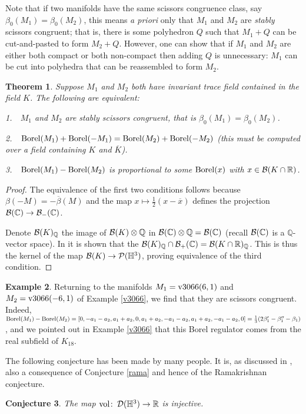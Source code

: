 \documentclass[a4paper]{amsart}
\def\H{{\mathbb H}}
\def\Q{{\mathbb Q}}
\def\R{{\mathbb R}}
\def\C{{\mathbb C}}
\def\K{\tilde{K}}
\newtheorem{theorem}{Theorem}[section]
\newtheorem{conjecture}[theorem]{Conjecture}
\theoremstyle{definition}
\newtheorem{example}[theorem]{Example}
\begin{document}
Note that if two manifolds have the same scissors congruence class,
say $\beta_0(M_1)=\beta_0(M_2)$, this means {\it a priori} only that
$M_1$ and $M_2$ are \emph{stably} scissors congruent; that is, there
is some polyhedron $Q$ such that $M_1+Q$ can be cut-and-pasted to form
$M_2+Q$. However, one can show that if $M_1$ and $M_2$ are either both
compact or both non-compact then adding $Q$ is unnecessary: $M_1$ can
be cut into polyhedra that can be reassembled to form $M_2$. 

\begin{theorem}\label{sc} Suppose $M_1$ and $M_2$ both have invariant
trace field contained in the field $K$. The following are equivalent: 

1.~~$M_1$ and $M_2$ are stably scissors congruent, that is
$\beta_0(M_1)=\beta_0(M_2)$.

2.~~$\operatorname{Borel}(M_1)+\operatorname{Borel}(-M_1)=\operatorname{Borel}(M_2)+\operatorname{Borel}(-M_2)$ (this must be
computed over a field containing $K$ and $\overline K$). 

3.~~$\operatorname{Borel}(M_1)-\operatorname{Borel}(M_2)$ is proportional to some $\operatorname{Borel}(x)$ with
$x\in\Bloch(K\cap\R)$.
\end{theorem}
\begin{proof} The equivalence of the first two conditions follows
because $\beta(-M)=-\overline\beta(M)$ and the map
$x\mapsto\frac12(x-\overline x)$ defines the projection
$\Bloch(\C)\to\Bloch_-(\C)$.

Denote $\Bloch(K)_\Q$ the image of $\Bloch(K)\otimes\Q$ in
$\Bloch(\C)\otimes\Q=\Bloch(\C)$ (recall $\Bloch(\C)$ is a $\Q$-vector
space). In \cite{neumann-yang2} it is shown that the
$\Bloch(K)_\Q\cap\Bloch_+(\C)=\Bloch(K\cap\R)_\Q$. This is thus the
kernel of the map $\Bloch(K)\to\sc(\H^3)$, proving equivalence of the
third condition.
\end{proof}

\begin{example}\def\K{K_{18}} Returning to the manifolds
$M_1=\hbox{v3066}(6,1)$ and $M_2=\hbox{v3066}(-6,1)$ of Example
\ref{v3066}, we find that they are scissors congruent. Indeed,
$\operatorname{Borel}(M_1)-\operatorname{Borel}(M_2)=
[0,-a_1-a_2,a_1+a_2,0,a_1+a_2,-a_1-a_2,a_1+a_2,-a_1-a_2,0]=
\frac13(2\beta_1'-\beta_1''-\beta_1)$, and we pointed out in Example
\ref{v3066} that this Borel regulator comes from the real subfield of
$\K$. \end{example}

The following conjecture has been made by many people. It is, as
discussed in \cite{neumann-hilbert}, also a consequence of Conjecture
\ref{rama} and hence of the Ramakrishnan conjecture.
\begin{conjecture} The map $\mbox{{\rm vol}}\colon\dehnker(\H^3)\to\R$ is
injective. \end{conjecture}
\end{document}
